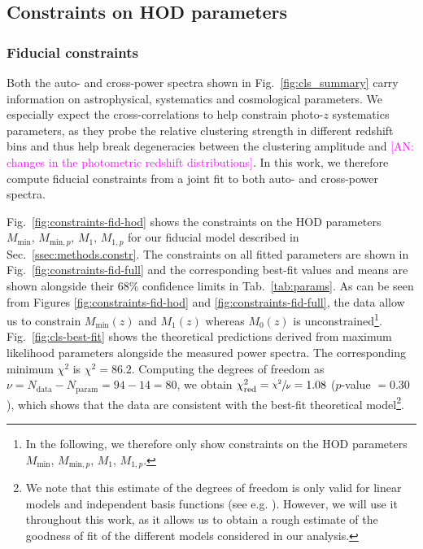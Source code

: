 \documentclass[a4paper,11pt]{article}
\newcommand{\an}[1]{{\textcolor{magenta}{[AN: #1]}}}
\begin{document}
  \subsection{Constraints on HOD parameters}\label{ssec:results.hod-constraints}
    \subsubsection{Fiducial constraints}\label{sssec:results.hod-constraints.fiducial}
      Both the auto- and cross-power spectra shown in Fig.~\ref{fig:cls_summary} carry information on astrophysical, systematics and cosmological parameters. We especially expect the cross-correlations to help constrain photo-$z$ systematics parameters, as they probe the relative clustering strength in different redshift bins and thus help break degeneracies between the clustering amplitude and \an{changes in the photometric redshift distributions}. In this work, we therefore compute fiducial constraints from a joint fit to both auto- and cross-power spectra.

      Fig.~\ref{fig:constraints-fid-hod} shows the constraints on the HOD parameters $M_{\mathrm{min}}, \allowbreak \, M_{\mathrm{min}, p}, \allowbreak \, M_{1}, \allowbreak \, M_{1, p}$ for our fiducial model described in Sec.~\ref{ssec:methods.constr}. The constraints on all fitted parameters are shown in Fig.~\ref{fig:constraints-fid-full} and the corresponding best-fit values and means are shown alongside their $68 \%$ confidence limits in Tab.~\ref{tab:params}. As can be seen from Figures \ref{fig:constraints-fid-hod} and \ref{fig:constraints-fid-full}, the data allow us to constrain $M_{\mathrm{min}}(z)$ and $M_{1}(z)$ whereas $M_{0}(z)$ is unconstrained\footnote{In the following, we therefore only show constraints on the HOD parameters $M_{\mathrm{min}}, \, M_{\mathrm{min}, p}, \, M_{1}, \, M_{1, p}$.}. Fig.~\ref{fig:cls-best-fit} shows the theoretical predictions derived from maximum likelihood parameters alongside the measured power spectra. The corresponding minimum $\chi^{2}$ is $\chi^{2} = 86.2$. Computing the degrees of freedom as $\nu = N_{\mathrm{data}} - N_{\mathrm{param}} = 94 - 14 = 80$, we obtain $\chi^{2}_{\mathrm{red}} = \sfrac{\chi^{2}}{\nu} = 1.08$ ($p$-value $= 0.30$), which shows that the data are consistent with the best-fit theoretical model\footnote{We note that this estimate of the degrees of freedom is only valid for linear models and independent basis functions (see e.g. \cite{Andrae:2010}). However, we will use it throughout this work, as it allows us to obtain a rough estimate of the goodness of fit of the different models considered in our analysis.}.
\end{document}
